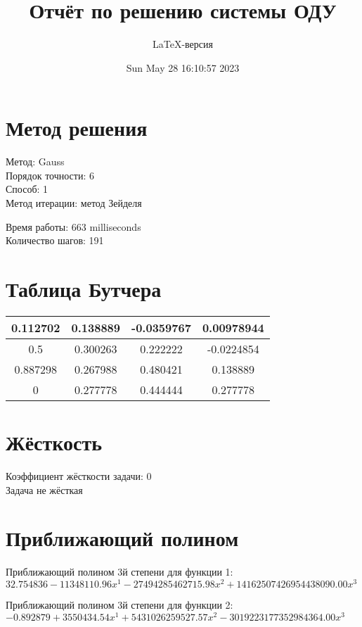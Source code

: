 \documentclass[a4paper,14pt]{extarticle}
\title{Отчёт по решению системы ОДУ}
\author{LaTeX-версия}
\date{Sun May 28 16:10:57 2023}
\begin{document}
\maketitle

\tableofcontents
\pagebreak

\section{Метод решения}

Метод: Gauss\\
Порядок точности: 6\\
Способ: 1\\
Метод итерации: метод Зейделя

Время работы: 663 milliseconds\\
Количество шагов: 191\\
\section{Таблица Бутчера}

\begin{table}[h]
\centering
\begin{tabular}{|c||c|c|c|}
\hline
0.112702 & 0.138889 & -0.0359767 & 0.00978944\\
\hline
0.5 & 0.300263 & 0.222222 & -0.0224854\\
\hline
0.887298 & 0.267988 & 0.480421 & 0.138889\\
\hline
0 & \cellcolor{lightgray} 0.277778 & \cellcolor{lightgray} 0.444444 & \cellcolor{lightgray} 0.277778\\
\hline
\end{tabular}
\end{table}

\section{Жёсткость}

Коэффициент жёсткости задачи: 0\\
Задача не жёсткая

\section{Приближающий полином}

Приближающий полином 3й степени для функции 1: $32.754836 - 11348110.96x^1 - 27494285462715.98x^2 + 14162507426954438090.00x^3$

Приближающий полином 3й степени для функции 2: $-0.892879 + 3550434.54x^1 + 5431026259527.57x^2 - 3019223177352984364.00x^3$
\end{document}
